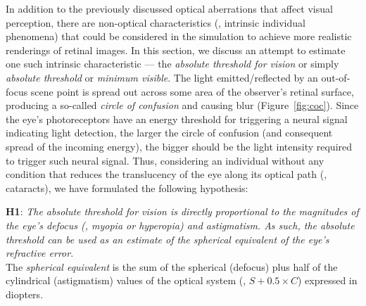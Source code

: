 

In addition to the previously discussed optical aberrations that affect visual perception, there are non-optical characteristics (\ie, intrinsic individual phenomena) that could be considered in the simulation to achieve more realistic renderings of retinal images. In this section, we discuss an attempt to estimate one such intrinsic characteristic --- the {\it absolute threshold for vision} or simply {\it absolute threshold} or  
{\it minimum visible}.  
The light emitted/reflected by an out-of-focus scene point is spread out across some area of the observer's retinal surface, producing a so-called {\it circle of confusion} and causing blur (Figure~\ref{fig:coc}). Since the eye's photoreceptors have an energy threshold for triggering a neural signal indicating light detection, the larger the circle of confusion (and consequent spread of the incoming energy), the bigger should be the light intensity required to trigger such neural signal. Thus, considering an individual without any condition that reduces the translucency of the eye along its optical path (\eg, cataracts), we have formulated the following hypothesis: 

\vspace{0.2cm}
\noindent
{\bf H1}:
{\it The absolute threshold for vision is directly proportional to the magnitudes of the eye's defocus (\ie, myopia or hyperopia) and astigmatism.
As such, the absolute threshold can be used as an estimate of the spherical equivalent of the eye's refractive error}. 
\\

The {\it spherical equivalent} is the sum of the spherical (defocus) plus half of the cylindrical (astigmatism) values of the optical system (\ie, $S + 0.5 \times C$) expressed in diopters.

